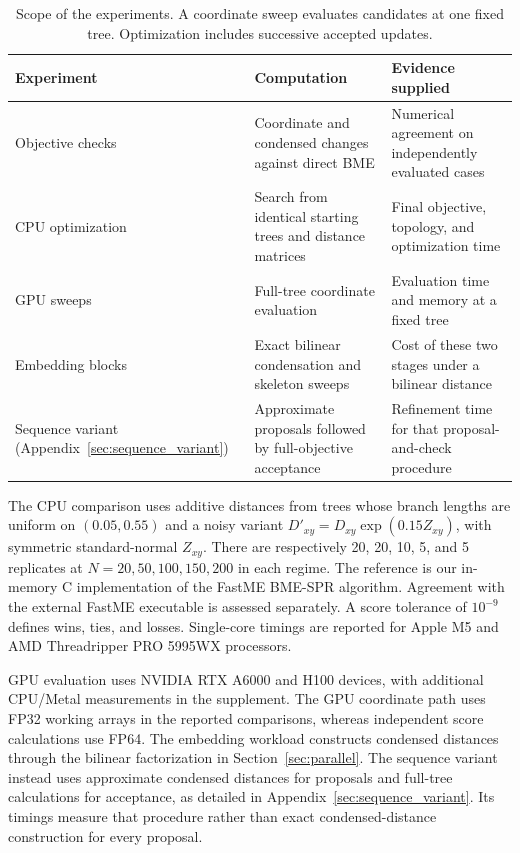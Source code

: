 \documentclass[11pt,a4paper]{article}
\makeatletter
\DeclareRobustCommand{\_}{\ifmmode\nfss@text{\textunderscore}\else\textunderscore\allowbreak\fi}
\theoremstyle{definition}
\makeatother
\begin{document}
\begin{table}[!htbp]
\centering\small
\caption{Scope of the experiments. A coordinate sweep evaluates candidates at one fixed tree. Optimization includes successive accepted updates.}
\label{tab:experiment_scope}
\begin{tabular}{@{}>{\raggedright\arraybackslash}p{.23\linewidth}>{\raggedright\arraybackslash}p{.36\linewidth}>{\raggedright\arraybackslash}p{.35\linewidth}@{}}
\toprule
Experiment & Computation & Evidence supplied\\
\midrule
Objective checks & Coordinate and condensed changes against direct BME & Numerical agreement on independently evaluated cases\\[3pt]
CPU optimization & Search from identical starting trees and distance matrices & Final objective, topology, and optimization time\\[3pt]
GPU sweeps & Full-tree coordinate evaluation & Evaluation time and memory at a fixed tree\\[3pt]
Embedding blocks & Exact bilinear condensation and skeleton sweeps & Cost of these two stages under a bilinear distance\\[3pt]
Sequence variant (Appendix~\ref{sec:sequence_variant}) & Approximate proposals followed by full-objective acceptance & Refinement time for that proposal-and-check procedure\\
\bottomrule
\end{tabular}
\end{table}

The CPU comparison uses additive distances from trees whose branch lengths are uniform on $(0.05,0.55)$ and a noisy variant
$D'_{xy}=D_{xy}\exp(0.15Z_{xy})$, with symmetric standard-normal $Z_{xy}$.
There are respectively 20, 20, 10, 5, and 5 replicates at
$N=20,50,100,150,200$ in each regime.
The reference is our in-memory C implementation of the FastME BME-SPR algorithm.
Agreement with the external FastME executable is assessed separately.
A score tolerance of $10^{-9}$ defines wins, ties, and losses.
Single-core timings are reported for Apple M5 and AMD Threadripper PRO 5995WX processors.

GPU evaluation uses NVIDIA RTX A6000 and H100 devices, with additional CPU/Metal measurements in the supplement.
The GPU coordinate path uses FP32 working arrays in the reported comparisons, whereas independent score calculations use FP64.
The embedding workload constructs condensed distances through the bilinear factorization in Section~\ref{sec:parallel}.
The sequence variant instead uses approximate condensed distances for proposals and full-tree calculations for acceptance, as detailed in Appendix~\ref{sec:sequence_variant}.
Its timings measure that procedure rather than exact condensed-distance construction for every proposal.
\end{document}
